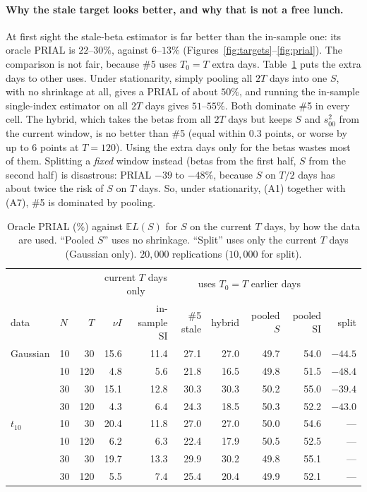 \documentclass[11pt]{article}
\theoremstyle{remark}
\begin{document}
\paragraph{Why the stale target looks better, and why that is not a free lunch.}
At first sight the stale-beta estimator is far better than the in-sample one: its oracle PRIAL is $22$--$30\%$, against $6$--$13\%$ (Figures~\ref{fig:targets}--\ref{fig:prial}). The comparison is not fair, because \#5 uses $T_0 = T$ extra days. Table~\ref{tab:bench} puts the extra days to other uses. Under stationarity, simply pooling all $2T$ days into one $S$, with no shrinkage at all, gives a PRIAL of about $50\%$, and running the in-sample single-index estimator on all $2T$ days gives $51$--$55\%$. Both dominate \#5 in every cell. The hybrid, which takes the betas from all $2T$ days but keeps $S$ and $s_{00}^2$ from the current window, is no better than \#5 (equal within $0.3$ points, or worse by up to $6$ points at $T = 120$). Using the extra days only for the betas wastes most of them. Splitting a \emph{fixed} window instead (betas from the first half, $S$ from the second half) is disastrous: PRIAL $-39$ to $-48\%$, because $S$ on $T/2$ days has about twice the risk of $S$ on $T$ days. So, under stationarity, (A1) together with (A7), \#5 is dominated by pooling.

\begin{table}[t]
\centering
\small
\caption{Oracle PRIAL (\%) against $\mathbb{E}L(S)$ for $S$ on the current $T$ days, by how the data are used. ``Pooled $S$'' uses no shrinkage. ``Split'' uses only the current $T$ days (Gaussian only). $20{,}000$ replications ($10{,}000$ for split).}\label{tab:bench}
\begin{tabular}{@{}llr|rr|rrrr|r@{}}
\toprule
 & & & \multicolumn{2}{c|}{current $T$ days only} & \multicolumn{4}{c|}{uses $T_0 = T$ earlier days} & \\
data & $N$ & $T$ & $\nu I$ & in-sample SI & \#5 stale & hybrid & pooled $S$ & pooled SI & split \\
\midrule
Gaussian & 10 & 30  & 15.6 & 11.4 & 27.1 & 27.0 & 49.7 & 54.0 & $-44.5$ \\
         & 10 & 120 & 4.8 & 5.6 & 21.8 & 16.5 & 49.8 & 51.5 & $-48.4$ \\
         & 30 & 30  & 15.1 & 12.8 & 30.3 & 30.3 & 50.2 & 55.0 & $-39.4$ \\
         & 30 & 120 & 4.3 & 6.4 & 24.3 & 18.5 & 50.3 & 52.2 & $-43.0$ \\
\midrule
$t_{10}$ & 10 & 30  & 20.4 & 11.8 & 27.0 & 27.0 & 50.0 & 54.6 & --- \\
         & 10 & 120 & 6.2 & 6.3 & 22.4 & 17.9 & 50.5 & 52.5 & --- \\
         & 30 & 30  & 19.7 & 13.3 & 29.9 & 30.2 & 49.8 & 55.1 & --- \\
         & 30 & 120 & 5.5 & 7.4 & 25.4 & 20.4 & 49.9 & 52.1 & --- \\
\bottomrule
\end{tabular}
\end{table}
\end{document}
